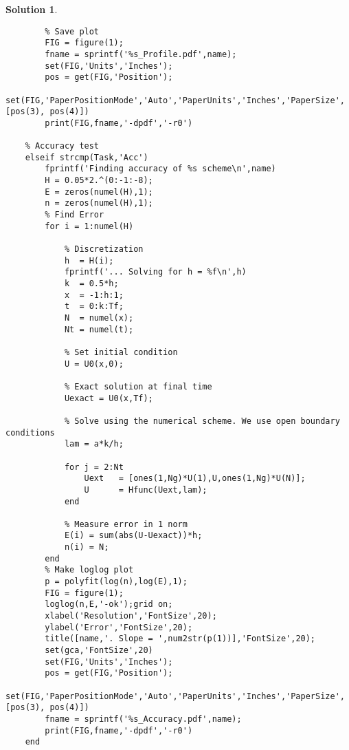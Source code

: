 \documentclass[10pt,letterpaper]{article}
\theoremstyle{break}
\newtheorem{solution}{Solution}
\begin{document}
\begin{solution}
\begin{lstlisting}
        % Save plot
        FIG = figure(1);
        fname = sprintf('%s_Profile.pdf',name);
        set(FIG,'Units','Inches');
        pos = get(FIG,'Position');
        set(FIG,'PaperPositionMode','Auto','PaperUnits','Inches','PaperSize',[pos(3), pos(4)])
        print(FIG,fname,'-dpdf','-r0')
        
    % Accuracy test
    elseif strcmp(Task,'Acc')
        fprintf('Finding accuracy of %s scheme\n',name)
        H = 0.05*2.^(0:-1:-8);
        E = zeros(numel(H),1);
        n = zeros(numel(H),1);
        % Find Error
        for i = 1:numel(H)
            
            % Discretization
            h  = H(i);
            fprintf('... Solving for h = %f\n',h)
            k  = 0.5*h;
            x  = -1:h:1;
            t  = 0:k:Tf;
            N  = numel(x);
            Nt = numel(t);
            
            % Set initial condition
            U = U0(x,0);
            
            % Exact solution at final time
            Uexact = U0(x,Tf);
            
            % Solve using the numerical scheme. We use open boundary conditions
            lam = a*k/h;
            
            for j = 2:Nt
                Uext   = [ones(1,Ng)*U(1),U,ones(1,Ng)*U(N)];
                U      = Hfunc(Uext,lam);
            end
            
            % Measure error in 1 norm
            E(i) = sum(abs(U-Uexact))*h;
            n(i) = N;
        end
        % Make loglog plot
        p = polyfit(log(n),log(E),1);
        FIG = figure(1);
        loglog(n,E,'-ok');grid on;
        xlabel('Resolution','FontSize',20);
        ylabel('Error','FontSize',20);
        title([name,'. Slope = ',num2str(p(1))],'FontSize',20);
        set(gca,'FontSize',20)
        set(FIG,'Units','Inches');
        pos = get(FIG,'Position');
        set(FIG,'PaperPositionMode','Auto','PaperUnits','Inches','PaperSize',[pos(3), pos(4)])
        fname = sprintf('%s_Accuracy.pdf',name);
        print(FIG,fname,'-dpdf','-r0')
    end
    \end{lstlisting}
    
\end{solution}
\end{document}
